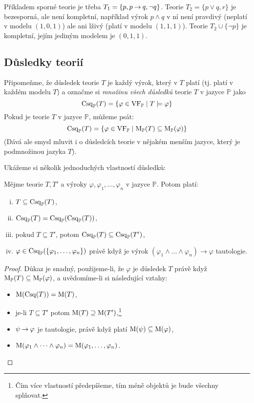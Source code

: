 \begin{example} 
    Příkladem sporné teorie je třeba $T_1=\{p,p\mathbin{\rightarrow} q,\neg q\}$. Teorie $T_2=\{p\lor q,r\}$ je bezesporná, ale není kompletní, například výrok $p\land q$ v ní není pravdivý (neplatí v modelu $(1,0,1)$) ale ani lživý (platí v modelu $(1,1,1)$). Teorie $T_2\cup\{\neg p\}$ je kompletní, jejím jediným modelem je $(0,1,1)$.
\end{example}

\subsection{Důsledky teorií}

Připomeňme, že důsledek teorie $T$ je každý výrok, který v $T$ platí (tj. platí v každém modelu $T$) a označme si \emph{množinu všech důsledků} teorie $T$ v jazyce $\mathbb P$ jako
$$
\operatorname{Csq}_\mathbb P(T)=\{\varphi\in\operatorname{VF}_\mathbb P\mid T\models \varphi\}
$$
Pokud je teorie $T$ v jazyce $\mathbb P$, můžeme psát: 
$$
\operatorname{Csq}_\mathbb P(T)=\{\varphi\in\operatorname{VF}_\mathbb P\mid \operatorname{M}_\mathbb P(T)\subseteq \operatorname{M}_\mathbb P(\varphi)\}
$$
(Dává ale smysl mluvit i o důsledcích teorie v nějakém menším jazyce, který je podmnožinou jazyka $T$). 

Ukážeme si několik jednoduchých vlastností důsledků:
\begin{proposition}\label{proposition:properties-of-consequences}
    Mějme teorie $T,T'$ a výroky $\varphi,\varphi_1,\dots,\varphi_n$ v jazyce $\mathbb P$. Potom platí:
    \begin{enumerate}[(i)]       
        \item $T\subseteq\operatorname{Csq}_\mathbb P(T)$,
        \item $\operatorname{Csq}_\mathbb P(T)=\operatorname{Csq}_\mathbb P(\operatorname{Csq}_\mathbb P(T))$,
        \item pokud $T\subseteq T'$, potom $\operatorname{Csq}_\mathbb P(T)\subseteq\operatorname{Csq}_\mathbb P(T')$,
        \item $\varphi\in\operatorname{Csq}_\mathbb P(\{\varphi_1,\dots,\varphi_n\})$ právě když je výrok $(\varphi_1\land \dots\land\varphi_n)\to\varphi$ tautologie.
    \end{enumerate}
\end{proposition}

\begin{proof}
    Důkaz je snadný, použijeme-li, že $\varphi$ je důsledek $T$ právě když $\operatorname{M}_\mathbb P(T)\subseteq \operatorname{M}_\mathbb P(\varphi)$, a uvědomíme-li si následující vztahy:
    \begin{itemize}
        \item $\operatorname{M}(\operatorname{Csq}(T))=\operatorname{M}(T)$,
        \item je-li $T\subseteq T'$ potom $\operatorname{M}(T)\supseteq\operatorname{M}(T')$,\footnote{Čím více vlastností předepíšeme, tím méně objektů je bude všechny splňovat.}
        \item $\psi\mathbin{\rightarrow}\varphi$ je tautologie, právě když platí $\operatorname{M}(\psi)\subseteq\operatorname{M}(\varphi)$,
        \item $\operatorname{M}(\varphi_1\land \dots\land\varphi_n)=\operatorname{M}(\varphi_1,\dots,\varphi_n)$.
    \end{itemize}
\end{proof}

